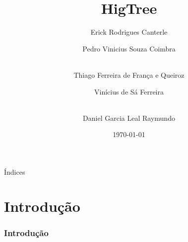\documentclass[aspectratio=169,t,xcolor=table]{beamer}
\begin{document}
	
	

\title{HigTree}
\author{Erick Rodrigues Canterle  \and  Pedro Vinicius Souza Coimbra \and \\
	Thiago Ferreira de França e Queiroz \and Vinícius de Sá Ferreira  \and \\
	Daniel Garcia Leal Raymundo}

\date{\today}
\frame[noframenumbering]{\titlepage}



\begin{frame}{Índices}
	\tableofcontents
\end{frame}



\section{Introdução}

\begin{frame}
	\frametitle{Introdução}
\end{frame}
\end{document}
